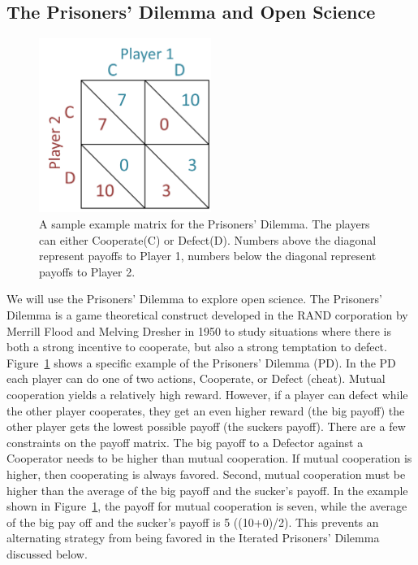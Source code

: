 \documentclass[11pt]{article} %
\begin{document}
\subsection{The Prisoners' Dilemma and Open Science}
\begin{figure}[ht]
	\includegraphics[width=0.5\textwidth]{files/figures/pdmatrix.png}
	\caption{A sample example matrix for the Prisoners' Dilemma. The players can either Cooperate(C) or Defect(D).  Numbers above the diagonal represent payoffs to Player 1, numbers below the diagonal represent payoffs to Player 2.}
	\label{pdmatrix}
\end{figure}
We will use the Prisoners' Dilemma to explore open science. The Prisoners' Dilemma is a game theoretical construct developed in the RAND corporation by Merrill Flood and Melving Dresher in 1950 \cite{ABAGFBEC19920101, unm.b196052419570101} to study situations where there is both a strong incentive to cooperate, but also a strong temptation to defect. Figure~\ref{pdmatrix} shows a specific example of the Prisoners' Dilemma (PD). In the PD each player can do one of two actions, Cooperate, or Defect (cheat). Mutual cooperation yields a relatively high reward. However, if a player can defect while the other player cooperates, they get an even higher reward (the big payoff) the other player gets the lowest possible payoff (the suckers payoff). There are a few constraints on the payoff matrix. The big payoff to a Defector against a Cooperator needs to be higher than mutual cooperation. If mutual cooperation is higher, then cooperating is always favored. Second, mutual cooperation must be higher than the average of the big payoff and the sucker's payoff. In the example shown in Figure~\ref{pdmatrix}, the payoff for mutual cooperation is seven, while the average of the big pay off and the sucker's payoff is 5 ((10+0)/2). This prevents an alternating strategy from being favored in the Iterated Prisoners' Dilemma discussed below.
\end{document}
